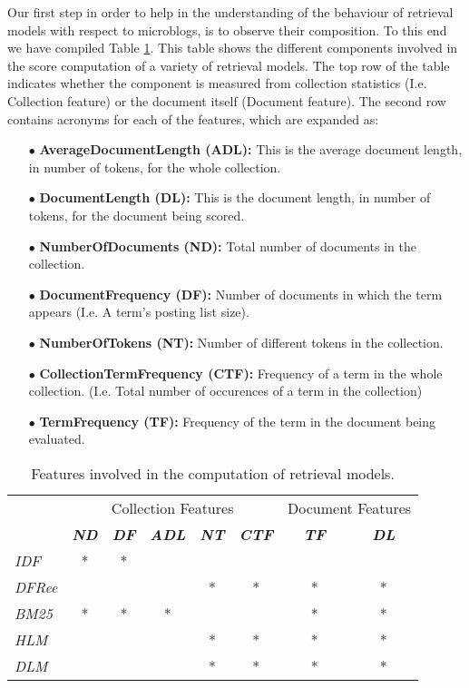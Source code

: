 Our first step in order to help in the understanding of the behaviour of retrieval models with respect to microblogs, is to observe their composition. To this end we have compiled Table \ref{modelfeatures}. This table shows the different components involved in the score computation of a variety of retrieval models. The top row of the table indicates whether the component is measured from collection statistics (I.e. Collection feature) or the document itself (Document feature). The second row contains acronyms for each of the features, which are expanded as: 

\begin{itemize}
\item [$\bullet$] \textbf{AverageDocumentLength (ADL):} This is the average document length, in number of tokens, for the whole collection.
\item [$\bullet$] \textbf{DocumentLength (DL):} This is the document length, in number of tokens, for the document being scored.
\item [$\bullet$] \textbf{NumberOfDocuments (ND):} Total number of documents in the collection. 
\item [$\bullet$] \textbf{DocumentFrequency (DF):} Number of documents in which the term appears (I.e. A term's posting list size).
\item [$\bullet$] \textbf{NumberOfTokens (NT):} Number of different tokens in the collection.
\item [$\bullet$] \textbf{CollectionTermFrequency (CTF):} Frequency of a term in the whole collection. (I.e. Total number of occurences of a term in the collection)
\item [$\bullet$] \textbf{TermFrequency (TF):} Frequency of the term in the document being evaluated.
\end{itemize}

\begin{table}[h!]
	\caption{Features involved in the computation of retrieval models.}
	\centering
	\begin{tabular}{|l|c|c|c|c|c||c|c|} 
		\cline{2- 8}
		\multicolumn{1}{c|}{}& \multicolumn{5}{c||}{Collection Features} &  \multicolumn{2}{c|}{Document Features} \tabularnewline
		\cline{2- 8}
		\multicolumn{1}{c|}{}
		& \textit{\textbf{ND} } & \textit{\textbf{DF} } & \textit{\textbf{ADL} } & \textit{\textbf{NT} } 
		& \textit{\textbf{CTF} } & \textit{\textbf{TF} } & \textit{\textbf{DL} } \tabularnewline \hline
		\textit{IDF} 	& * &  *&  	&   &  	&	&   \tabularnewline \hline
		\textit{DFRee} 	&   &   &   & * & * &*	&* \tabularnewline \hline
		\textit{BM25}	& * &  *& * &   &  	&*	&* \tabularnewline \hline
		\textit{HLM} 	&   &   &  	& * & * &*	&* \tabularnewline \hline
		\textit{DLM} 	&   &   &  	& * & * &*	&* \tabularnewline \hline
	\end{tabular}
	\label{modelfeatures}
\end{table}

